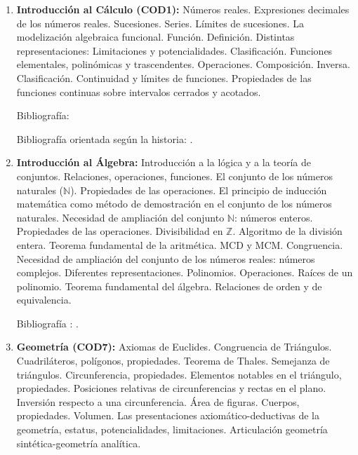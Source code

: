 \documentclass[a4paper, 12pt]{article}
\begin{document}
\begin{enumerate}

\item \textbf{Introducción al Cálculo  (COD1):} Números reales. Expresiones decimales de los números reales. Sucesiones. Series. Límites de sucesiones.  La modelización algebraica funcional. Función. Definición. Distintas representaciones: Limitaciones y potencialidades. Clasificación. Funciones elementales, polinómicas y trascendentes. Operaciones. Composición. Inversa. Clasificación.  Continuidad y límites de funciones. Propiedades de las funciones continuas sobre intervalos cerrados y acotados. 

Bibliografía: \cite{PeterD.Lax631,MichaelSpivak649,thomas2005calculo}
 

Bibliografía orientada según la historia: \cite{ErnstHairer633,DavidApplebaum639,OttoToeplitz642,DavidBressoud643,DavidM.Bressoud651,DavidM.Bressoud688}.

 
\item \textbf{Introducción al Álgebra:}
Introducción a la lógica y a la teoría de conjuntos. Relaciones, operaciones, funciones. El
conjunto de los números naturales ($\mathbb{N}$). Propiedades de las operaciones.  El principio de
inducción matemática como método de demostración en el conjunto de los números
naturales. Necesidad de ampliación del conjunto $\mathbb{N}$: números enteros. Propiedades de las
operaciones. Divisibilidad en $\mathbb{Z}$. Algoritmo de la división entera. Teorema fundamental de la
aritmética. MCD y MCM. Congruencia. Necesidad de ampliación del conjunto de los números reales:
números complejos. Diferentes representaciones.  Polinomios. Operaciones. Raíces de un
polinomio. Teorema fundamental del álgebra.  Relaciones de orden y de equivalencia.

 
  
Bibliografía : \cite{TeresaKrick661,grimaldi,Johnsonbaugh2005,ross1988}.
 



\item \textbf{Geometría  (COD7):} Axiomas de Euclides. Congruencia de Triángulos. Cuadriláteros, polígonos, propiedades. Teorema de Thales. Semejanza de triángulos. Circunferencia, propiedades. Elementos notables en el triángulo, propiedades. Posiciones relativas de circunferencias y rectas en el plano. Inversión respecto a una circunferencia. Área de figuras.  Cuerpos, propiedades. Volumen.  Las presentaciones axiomático-deductivas de la geometría, estatus, potencialidades, limitaciones. Articulación geometría sintética-geometría analítica.


\end{enumerate}
\end{document}
